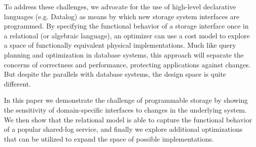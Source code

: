 To address these challenges, we advocate for the use of high-level declarative
languages (e.g. Datalog) as means by which new storage system interfaces are
programmed. By specifying the functional behavior of a storage interface once
in a relational (or algebraic language), an optimizer can use a cost model to
explore a space of functionally equivalent physical implementations. Much like
query planning and optimization in database systems, this approach will
separate the concerns of correctness and performance, protecting applications
against changes. But despite the parallels with database systems, the design
space is quite different.

In this paper we demonstrate the challenge of programmable storage by showing
the sensitivity of domain-specific interfaces to changes in the underlying
system. We then show that the relational model is able to capture the
functional behavior of a popular shared-log service, and finally we explore
additional optimizations that can be utilized to expand the space of
possible implementations.
